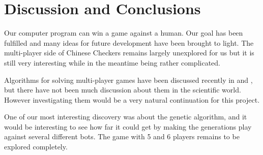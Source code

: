 \section{Discussion and Conclusions}

Our computer program can win a game against a human.
Our goal has been fulfilled and many ideas for future development have
been brought to light.
The multi-player side of Chinese Checkers remains largely unexplored
for us but it is still very interesting while in the meantime being rather
complicated.

Algorithms for solving multi-player games have been discussed recently in
\cite{Hashavit} and \cite{bestreplysearch}, but there have not been much
discussion about them in the scientific world. However investigating them
would be a very natural continuation for this project.

One of our most interesting discovery was about the genetic algorithm, and
it would be interesting to see how far it could get by making the generations play
against several different bots. The game with 5 and 6 players remains to be
explored completely.

